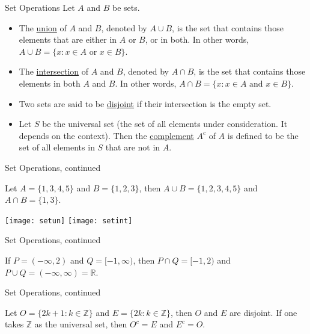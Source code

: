 \begin{frame}{Set Operations}
 Let $A$ and $B$ be sets. 
\begin{itemize}
\item The \underline{union} of $A$ and $B$, denoted by $A\cup B$, is the set that contains those elements that are either in $A$ or $B$, or in both.  In other words, $A\cup B=\{x: x\in A \text{ or } x\in B\}$. 
\item The \underline{intersection} of $A$ and $B$, denoted by $A\cap B$, is the set that contains those elements in both $A$ and $B$.  In other words, $A\cap B=\{x: x\in A \text{ and } x\in B\}$. 
\item Two sets are said to be \underline{disjoint} if their intersection is the empty set. 
\item Let $S$ be the universal set (the set of all elements under consideration. It depends on the context).  Then the \underline{complement} $A^c$ of $A$ is defined to be the set of all elements in $S$ that are not in $A$.
\end{itemize}

\end{frame}

\begin{frame}{Set Operations, continued}
\begin{example} Let $A=\{1,3,4,5\}$ and $B=\{1,2,3\}$, then $A\cup B=\{1,2,3,4,5\}$ and $A\cap B=\{1,3\}$.
\end{example}

\begin{center}
\texttt{[image: setun]}
\texttt{[image: setint]}
\end{center}
\end{frame}

\begin{frame}{Set Operations, continued}
\begin{example}
If $P=(-\infty, 2)$ and $Q=[-1,\infty)$, then $P\cap Q=[-1,2)$ and $P\cup Q=(-\infty,\infty)=\mathbb{R}$.
\end{example}
\end{frame}

\begin{frame}{Set Operations, continued}
\begin{example} Let $O=\{2k+1: k\in \mathbb{Z}\}$ and $E=\{2k: k\in \mathbb{Z}\}$, then $O$ and $E$ are disjoint.  If one takes $\mathbb{Z}$ as the universal set, then $O^c=E$ and $E^c=O$.
\end{example}

\end{frame}

